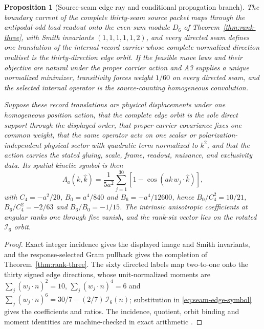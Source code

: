 \documentclass[11pt]{article}
\newtheorem{proposition}[theorem]{Proposition}
\theoremstyle{definition}
\theoremstyle{remark}
\begin{document}
\begin{proposition}[Source-seam edge ray and conditional propagation branch]
\label{prop:seam-edge-prediction}
The boundary current of the complete thirty-seam source packet maps through
the antipodal-odd load readout onto the even-sum module $D_6$ of
Theorem~\ref{thm:rank-three}, with Smith invariants $(1,1,1,1,1,2)$, and every
directed seam defines one translation of the internal record carrier whose
complete normalized direction multiset is the thirty-direction edge orbit. If
the feasible move laws and their objective are natural under the proper
carrier action and A3 supplies a unique normalized minimizer, transitivity
forces weight $1/60$ on every directed seam, and the selected internal
operator is the source-counting homogeneous convolution.

Suppose these record translations are physical displacements under one
homogeneous position action, that the complete edge orbit is the sole direct
support through the displayed order, that proper-carrier covariance fixes one
common weight, that the same operator acts on one scalar or
polarization-independent physical sector with quadratic term normalized to
$k^2$, and that the action carries the stated gluing, scale, frame, readout,
nuisance, and exclusivity data. Its spatial kinetic symbol is then
\begin{equation}
\Lambda_a(k,\widehat k)=\frac{1}{5a^2}\sum_{j=1}^{30}
 \left[1-\cos\!\left(ak\,w_j\!\cdot\!\widehat k\right)\right],
\label{eq:seam-edge-symbol}
\end{equation}
with $C_4=-a^2/20$, $B_0=a^4/840$ and $B_6=-a^4/12600$, hence
$B_0/C_4^2=10/21$, $B_6/C_4^2=-2/63$ and $B_6/B_0=-1/15$.
The intrinsic anisotropic coefficients at angular ranks one through five
vanish, and the rank-six vector lies on the rotated $\mathcal I_6$ orbit.
\end{proposition}

\begin{proof}
Exact integer incidence gives the displayed image and Smith invariants, and
the response-selected Gram pullback gives the completion of
Theorem~\ref{thm:rank-three}. The sixty directed labels map two-to-one onto
the thirty signed edge directions, whose unit-normalized moments are
$\sum_j(w_j\!\cdot n)^2=10$, $\sum_j(w_j\!\cdot n)^4=6$ and
$\sum_j(w_j\!\cdot n)^6=30/7-(2/7)\,\mathcal I_6(n)$; substitution in
\eqref{eq:seam-edge-symbol} gives the coefficients and ratios. The
incidence, quotient, orbit binding and moment identities are machine-checked
in exact arithmetic \cite{ophrepo}.
\end{proof}
\end{document}
